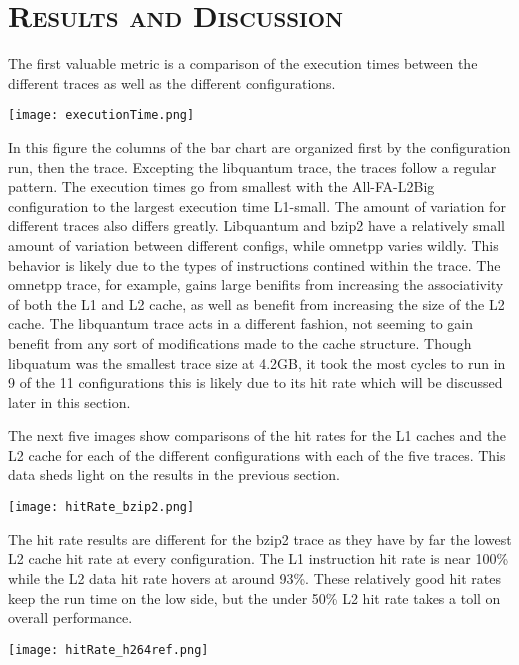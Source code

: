 \documentclass[cacheSimReport.tex]{subfiles}
\begin{document}
\section*{\textsc{\Large Results and Discussion}}

The first valuable metric is a comparison of the execution times between the different traces as well as the different configurations.

\smallskip

\hspace{-.9cm}\texttt{[image: executionTime.png]}

In this figure the columns of the bar chart are organized first by the configuration run, then the trace. Excepting the libquantum trace, the traces follow a regular pattern. The execution times go from smallest with the All-FA-L2Big configuration to the largest execution time L1-small. The amount of variation for different traces also differs greatly. Libquantum and bzip2 have a relatively small amount of variation between different configs, while omnetpp varies wildly. This behavior is likely due to the types of instructions contined within the trace. The omnetpp trace, for example, gains large benifits from increasing the associativity of both the L1 and L2 cache, as well as benefit from increasing the size of the L2 cache. The libquantum trace acts in a different fashion, not seeming to gain benefit from any sort of modifications made to the cache structure. Though libquatum was the smallest trace size at 4.2GB, it took the most cycles to run in 9 of the 11 configurations this is likely due to its hit rate which will be discussed later in this section.

\smallskip

The next five images show comparisons of the hit rates for the L1 caches and the L2 cache for each of the different configurations with each of the five traces. This data sheds light on the results in the previous section.

\hspace{-.9cm}\texttt{[image: hitRate\_bzip2.png]}

The hit rate results are different for the bzip2 trace as they have by far the lowest L2 cache hit rate at every configuration. The L1 instruction hit rate is near 100\% while the L2 data hit rate hovers at around 93\%. These relatively good hit rates keep the run time on the low side, but the under 50\% L2 hit rate takes a toll on overall performance.

\hspace{-.9cm}\texttt{[image: hitRate\_h264ref.png]}
\end{document}
